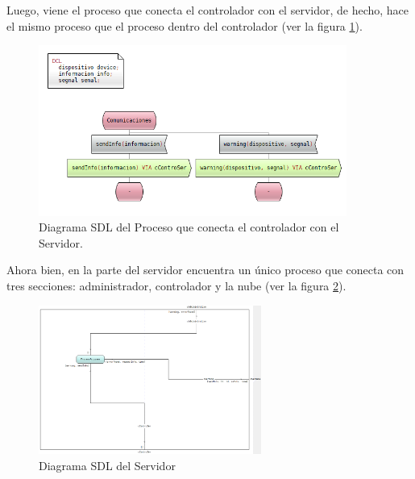 Luego, viene el proceso que conecta el controlador con el servidor, de hecho, hace el mismo proceso que el proceso dentro del controlador (ver la figura \ref{SDL_PcontroSer}).

\begin{figure}[h]
    \centering
    \includegraphics[width=0.9\textwidth]{images/SDL_ProcesoControSer.png}
    \caption{Diagrama SDL del Proceso que conecta el controlador con el Servidor.}
    \label{SDL_PcontroSer}
\end{figure}

\pagebreak

Ahora bien, en la parte del servidor encuentra un único proceso que conecta con tres secciones: administrador, controlador y la nube (ver la figura \ref{SDL_Servidor}).

\begin{figure}[h]
    \centering
    \includegraphics[width=0.65\textwidth]{images/SDL_Servidor.png}
    \caption{Diagrama SDL del Servidor}
    \label{SDL_Servidor}
\end{figure}

\pagebreak

